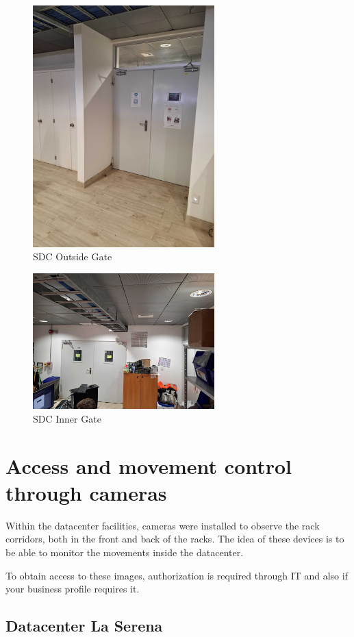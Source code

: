 \begin{figure}
    \includegraphics[width=7cm]{20.jpg}
    \centering
    \caption*{SDC Outside Gate}
  \end{figure}
  \begin{figure}
    \includegraphics[width=7cm]{21.jpg}
    \centering
    \caption*{SDC Inner Gate}
  \end{figure}

\section{Access and movement control through cameras}

Within the datacenter facilities, cameras were installed to observe the rack corridors, both in the front and back of the racks. The idea of these devices is to be able to monitor the movements inside the datacenter.

To obtain access to these images, authorization is required through IT and also if your business profile requires it.

\subsection{Datacenter La Serena}

